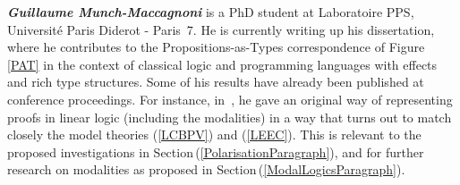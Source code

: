 \documentclass[11pt,twocolumn]{article}
\newcommand{\pref}[1]{\,(\ref{#1})}
\newcommand{\eg}{\emph{eg.}}
\newcommand{\SystemL}{\mbox{System~$L$}}
\begin{document}
\smallskip\noindent
\textbf{\em Guillaume Munch-Maccagnoni} 
%
%
is a PhD student at Laboratoire PPS, Universit\'e Paris Diderot - Paris~7.
He is currently writing up his dissertation, where he contributes to the
Propositions-as-Types correspondence of Figure\,\ref{PAT} in the context of
classical logic and programming languages with effects and rich type
structures.  Some of his results have already been published at conference
proceedings. %
For instance, 
%
%
in~\cite{Munch}, 
he gave an original way of representing proofs in linear logic (including the
modalities) in a way that turns out to match closely the model theories
(\ref{LCBPV}) and (\ref{LEEC}).  This is relevant to the proposed
investigations in Section\mbox{\pref{PolarisationParagraph}}, and for further
research on modalities as proposed in Section\pref{ModalLogicsParagraph}.
%

\end{document}
